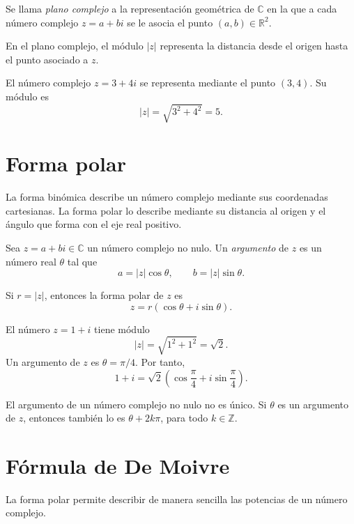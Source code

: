 \begin{definicion}
Se llama \emph{plano complejo} a la representación geométrica de \(\mathbb{C}\) en la que a cada número complejo \(z=a+bi\) se le asocia el punto \((a,b)\in\mathbb{R}^2\).
\end{definicion}

En el plano complejo, el módulo \(|z|\) representa la distancia desde el origen hasta el punto asociado a \(z\).

\begin{ejemplo}
El número complejo \(z=3+4i\) se representa mediante el punto \((3,4)\). Su módulo es
\[
  |z|=\sqrt{3^2+4^2}=5.
\]
\end{ejemplo}

\section{Forma polar}

La forma binómica describe un número complejo mediante sus coordenadas cartesianas. La forma polar lo describe mediante su distancia al origen y el ángulo que forma con el eje real positivo.

\begin{definicion}[Argumento]
Sea \(z=a+bi\in\mathbb{C}\) un número complejo no nulo. Un \emph{argumento} de \(z\) es un número real \(\theta\) tal que
\[
  a=|z|\cos\theta,
  \qquad
  b=|z|\sin\theta.
\]
\end{definicion}

Si \(r=|z|\), entonces la forma polar de \(z\) es
\[
  z=r(\cos\theta+i\sin\theta).
\]

\begin{ejemplo}
El número \(z=1+i\) tiene módulo
\[
  |z|=\sqrt{1^2+1^2}=\sqrt{2}.
\]
Un argumento de \(z\) es \(\theta=\pi/4\). Por tanto,
\[
  1+i=\sqrt{2}\left(\cos\frac{\pi}{4}+i\sin\frac{\pi}{4}\right).
\]
\end{ejemplo}

\begin{advertencia}
El argumento de un número complejo no nulo no es único. Si \(\theta\) es un argumento de \(z\), entonces también lo es \(\theta+2k\pi\), para todo \(k\in\mathbb{Z}\).
\end{advertencia}

\section{Fórmula de De Moivre}

La forma polar permite describir de manera sencilla las potencias de un número complejo.

